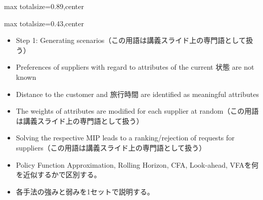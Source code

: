 \begin{minipage}[t]{0.58\textwidth}
\begin{adjustbox}{max totalsize={\textwidth}{0.89\textheight},center}
\begin{minipage}{\textwidth}
\end{minipage}
\end{adjustbox}
\end{minipage}


\clearpage
{}
\begin{minipage}[t]{0.405\textwidth}
\begin{adjustbox}{max totalsize={\textwidth}{0.43\textheight},center}
\begin{minipage}{\textwidth}\scriptsize
{}\begin{itemize}
\item Step 1: Generating scenarios（この用語は講義スライド上の専門語として扱う）
\item Preferences of suppliers with regard to attributes of the current 状態 are not known
\item Distance to the customer and 旅行時間 are identified as meaningful attributes
\item The weights of attributes are modified for each supplier at random（この用語は講義スライド上の専門語として扱う）
\item Solving the respective MIP leads to a ranking/rejection of requests for suppliers（この用語は講義スライド上の専門語として扱う）
\end{itemize}\begin{itemize}
\item Policy Function Approximation, Rolling Horizon, CFA, Look-ahead, VFAを何を近似するかで区別する。
\item 各手法の強みと弱みを1セットで説明する。
\end{itemize}
\end{minipage}
\end{adjustbox}
\end{minipage}\hfill
